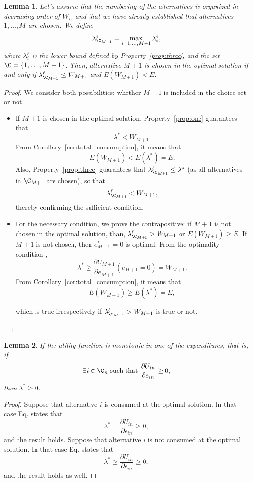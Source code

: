 \documentclass[12pt,a4paper]{article}
\newtheorem{lemma}{Lemma}
\begin{document}
\begin{lemma}
    \label{lemma:next_alt}
    Let's assume that the numbering of the alternatives is organized in decreasing order of $W_i$,
and that we have already established that alternatives $1,\ldots, M$ are chosen. We define
    \[
        \lambda^{\ell}_{\C_{M+1}} = \max_{i=1, \ldots, M+1}\lambda^\ell_i,
    \]
    where $\lambda^\ell_i$ is the lower bound defined by Property~\ref{prop:three}, and the set $\C=\{1,\ldots, M+1\}$.
    Then, alternative $M+1$ is chosen in the optimal solution if and only if $\lambda^\ell_{\C_{M+1}} \leq W_{M+1}$ and $E(W_{M+1})< E$.
\end{lemma}
\begin{proof}
    We consider both possibilities: whether $M+1$ is included in the choice set or not.
    \begin{itemize}
        \item If $M+1$ is chosen in the optimal solution, Property~\ref{prop:one} guarantees that
         \[
        \lambda^* < W_{M+1}.
         \]
        From Corollary~\ref{cor:total_consumption}, it means that
        \[
            E(W_{M+1}) < E(\lambda^*) = E.
        \]
        Also, Property~\ref{prop:three} guarantees that $\lambda^\ell_{\C_{M+1}} \leq \lambda^*$ (as all alternatives in $\C_{M+1}$ are chosen), so that
        \[
        \lambda^\ell_{\C_{M+1}} < W_{M+1},
         \]
         thereby confirming the sufficient condition.
        \item For the necessary condition, we prove the contrapositive: if  $M+1$ is not chosen in the optimal solution, than,
        $\lambda^\ell_{\C_{M+1}} > W_{M+1}$ or $E(W_{M+1}) \geq E$.
        If $M+1$ is not chosen, then $e^*_{M+1}=0$ is optimal. From the optimality condition ,
    \[
        \lambda^* \geq \frac{\partial U_{M+1}}{\partial e_{M+1}}(e_{M+1}=0) = W_{M+1}.
    \]
        From Corollary~\ref{cor:total_consumption}, it means that
        \[
            E( W_{M+1}) \geq E(\lambda^*) = E,
        \]

        which is true irrespectively if $\lambda^\ell_{\C_{M+1}} > W_{M+1}$ is true or not.
    \end{itemize}
\end{proof}

\begin{lemma}
    \label{lemma:monotonic}
    If the utility function is monotonic in one of the expenditures, that is, if
    \[
        \exists i \in \C_n \text{ such that } \frac{\partial U_{in}}{\partial e_{in}} \geq 0,
    \]
    then $\lambda^* \geq 0$.
\end{lemma}
\begin{proof}
    Suppose that alternative $i$ is consumed at the optimal solution. In that case Eq.  states that
    \[
      \lambda^* =  \frac{\partial U_{in}}{\partial e_{in}} \geq 0,
    \]
    and the result holds.
    Suppose that alternative $i$ is not consumed at the optimal solution. In that case Eq.  states that
    \[
      \lambda^* \geq  \frac{\partial U_{in}}{\partial e_{in}} \geq 0,
    \]
    and the result holds as well.
\end{proof}
\end{document}
